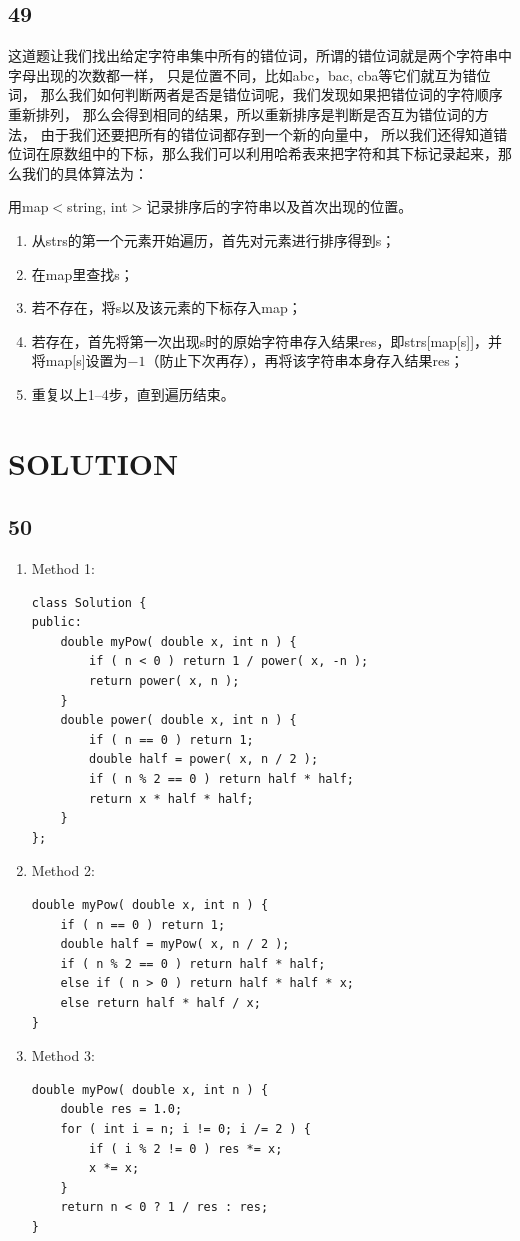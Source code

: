 \documentclass[12pt,a4paper]{article}
\begin{document}
\subsection{49}
\begin{CJK}{UTF8}{gbsn}
这道题让我们找出给定字符串集中所有的错位词，所谓的错位词就是两个字符串中字母出现的次数都一样，
只是位置不同，比如abc，bac, cba等它们就互为错位词，
那么我们如何判断两者是否是错位词呢，我们发现如果把错位词的字符顺序重新排列，
那么会得到相同的结果，所以重新排序是判断是否互为错位词的方法，
由于我们还要把所有的错位词都存到一个新的向量中，
所以我们还得知道错位词在原数组中的下标，那么我们可以利用哈希表来把字符和其下标记录起来，那么我们的具体算法为：
\par
用map$<$string, int$>$记录排序后的字符串以及首次出现的位置。
\begin{enumerate}
\item 从strs的第一个元素开始遍历，首先对元素进行排序得到s；
\item 在map里查找s；
\item 若不存在，将s以及该元素的下标存入map；
\item 若存在，首先将第一次出现s时的原始字符串存入结果res，即strs[map[s]]，并将map[s]设置为$-1$（防止下次再存），再将该字符串本身存入结果res；
\item 重复以上1--4步，直到遍历结束。
\end{enumerate}
\end{CJK}

\section{SOLUTION}
\subsection{50}
\begin{enumerate}
\item Method 1:
\begin{lstlisting}
class Solution {
public:
	double myPow( double x, int n ) {
		if ( n < 0 ) return 1 / power( x, -n );
		return power( x, n );
	}
	double power( double x, int n ) {
		if ( n == 0 ) return 1;
		double half = power( x, n / 2 );
		if ( n % 2 == 0 ) return half * half;
		return x * half * half;
	}
};
\end{lstlisting}
\item Method 2:
\begin{lstlisting}
double myPow( double x, int n ) {
	if ( n == 0 ) return 1;
	double half = myPow( x, n / 2 );
	if ( n % 2 == 0 ) return half * half;
	else if ( n > 0 ) return half * half * x;
	else return half * half / x;
}
\end{lstlisting}
\item Method 3:
\begin{lstlisting}
double myPow( double x, int n ) {
	double res = 1.0;
	for ( int i = n; i != 0; i /= 2 ) {
		if ( i % 2 != 0 ) res *= x;
		x *= x;
	}
	return n < 0 ? 1 / res : res;
}
\end{lstlisting}
\end{enumerate}
\end{document}
